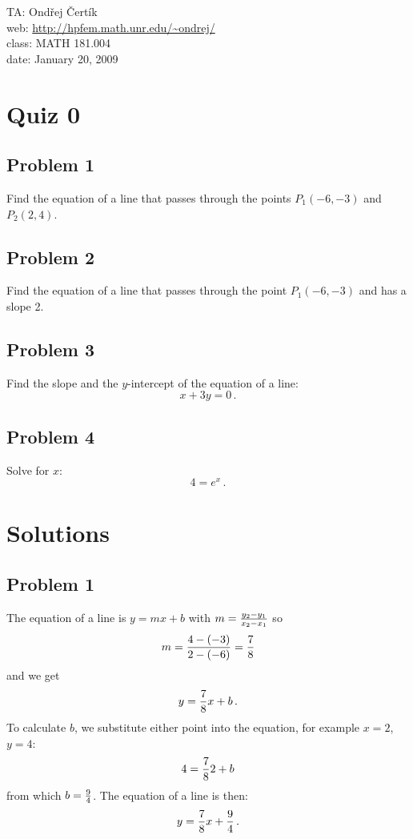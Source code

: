 \documentclass[10pt]{article}
\begin{document}
\noindent TA: Ondřej Čertík\\
web: \url{http://hpfem.math.unr.edu/~ondrej/}\\
class: MATH 181.004\\
date: January 20, 2009

\section*{Quiz 0}

\subsection*{Problem 1}

Find the equation of a line that passes through the points $P_1(-6, -3)$ and
$P_2(2, 4)$.

\subsection*{Problem 2}

Find the equation of a line that passes through the point $P_1(-6, -3)$ and has
a slope 2.

\subsection*{Problem 3}

Find the slope and the $y$-intercept of the equation of a line:
$$x+3y=0\,.$$

\subsection*{Problem 4}

Solve for $x$:
$$4=e^x\,.$$

\section*{Solutions}

\subsection*{Problem 1}

The equation of a line is $y=mx+b$ with $m={y_2-y_1\over x_2-x_1}$ so
$$m={4-(-3)\over2-(-6)}={7\over8}$$
and we get
$$y={7\over8}x+b\,.$$
To calculate $b$, we substitute either point into the equation, for example
$x=2$, $y=4$:
$$4={7\over8}2+b$$
from which $b={9\over4}$. The equation of a line is then:
$$y={7\over8}x+{9\over 4}\,.$$
\end{document}
